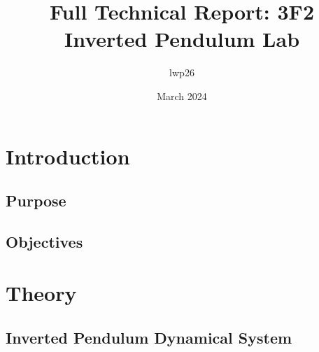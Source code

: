 \documentclass{article}
\begin{document}
\title{Full Technical Report: 3F2 Inverted Pendulum Lab}
\author{lwp26}
\date{March 2024}
\maketitle 

\begin{abstract}
    \centering

\end{abstract}

\newpage

\section{Introduction}

\subsection{Purpose}

\subsection{Objectives}

\section{Theory}

\subsection{Inverted Pendulum Dynamical System}
\end{document}

